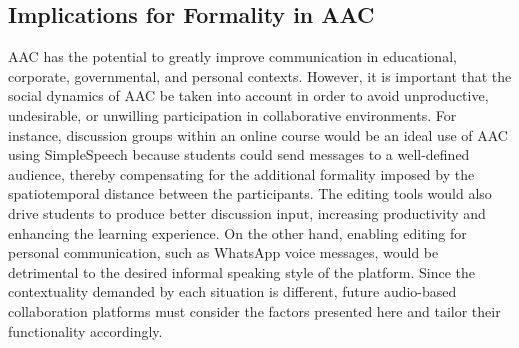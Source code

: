 \subsection{Implications for Formality in AAC}
AAC has the potential to greatly improve communication in educational, corporate, governmental, and personal contexts.
However, it is important that the social dynamics of AAC be taken into account in order to avoid unproductive, undesirable, or unwilling participation in collaborative environments.
For instance, discussion groups within an online course would be an ideal use of AAC using SimpleSpeech because students could send messages to a well-defined audience, thereby compensating for the additional formality imposed by the spatiotemporal distance between the participants. 
The editing tools would also drive students to produce better discussion input, increasing productivity and enhancing the learning experience.
On the other hand, enabling editing for personal communication, such as WhatsApp voice messages, would be detrimental to the desired informal speaking style of the platform.
Since the contextuality demanded by each situation is different, future audio-based collaboration platforms must consider the factors presented here and tailor their functionality accordingly.